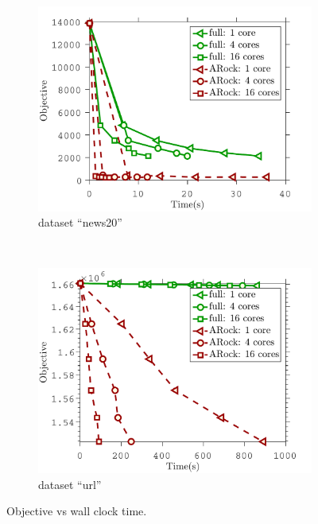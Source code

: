 \begin{figure}[!h]
        \centering
       \begin{subfigure}[b]{0.4\textwidth}
                \includegraphics[width=\textwidth]{./figs/news20_obj}
                \caption{dataset ``news20''}
        \end{subfigure}
        ~~
        \begin{subfigure}[b]{0.4\textwidth}
                \includegraphics[width=\textwidth]{./figs/url_obj}
                \caption{dataset ``url''}
        \end{subfigure} 
        \caption{Objective vs wall clock time.}\label{fig:log_reg_obj}
\end{figure}

